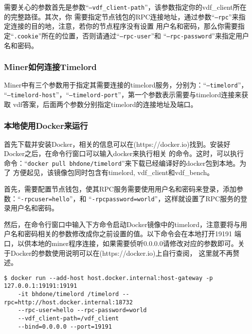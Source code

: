 \normalsize
\begin{flushleft}
    需要关心的参数首先是参数``\texttt{--vdf_client-path}''，该参数指定你的vdf\_client所在的完整路径。其次，你
    需要指定节点钱包的RPC连接地址，通过参数``\texttt{--rpc}''来指定连接的目的地，注意，若你的节点程序没有设置
    用户名和密码，那么你需要指定``\texttt{.cookie}''所在的位置，否则请通过``\texttt{--rpc-user}''和
    ``\texttt{--rpc-password}''来指定用户名和密码。
\end{flushleft}
\subsubsection{Miner如何连接Timelord}
\begin{flushleft}
    Miner中有三个参数用于指定其需要连接的timelord服务，分别为：``\texttt{--timelord}''，
    ``\texttt{--timelord-host}''，``\texttt{--timelord-port}''，第一个参数表示需要与timelord连接来获取
    vdf答案，后面两个参数分别指定timelord的连接地址及端口。
\end{flushleft}
\subsubsection{本地使用Docker来运行}
\begin{flushleft}
    首先下载并安装Docker，相关的信息可以在(https://docker.io)找到。安装好Docker之后，在命令行窗口可以输入docker来执行相关
    的命令。这时，可以执行命令：``\texttt{docker pull bhdone/timelord}''来下载已经编译好的docker包到本地。为了
    方便起见，该镜像包同时包含有timelord, vdf\_client和vdf\_bench。
\end{flushleft}
\begin{flushleft}
    首先，需要配置节点钱包，使其RPC服务需要使用用户名和密码来登录，添加参数：``\texttt{-rpcuser=hello}''，和
    ``\texttt{-rpcpassword=world}''，这样就设置了RPC服务的登录用户名和密码。
\end{flushleft}
\begin{flushleft}
    然后，在命令行窗口中输入下方命令启动Docker镜像中的timelord，注意要将与用户名和密码相关的参数修改成你之前设置的值。以下命令会在本地打开19191
    端口，以供本地的miner程序连接，如果需要侦听0.0.0.0请修改对应的参数即可。关于Docker的参数使用说明可以在(https://docker.io)上自行查阅，
    这里就不再赘述。
\end{flushleft}
\scriptsize
\begin{verbatim}
$ docker run --add-host host.docker.internal:host-gateway -p 127.0.0.1:19191:19191
    -it bhdone/timelord /timelord --rpc=http://host.docker.internal:18732
    --rpc-user=hello --rpc-password=world
    --vdf_client-path=/vdf_client
    --bind=0.0.0.0 --port=19191
\end{verbatim}
\normalsize
